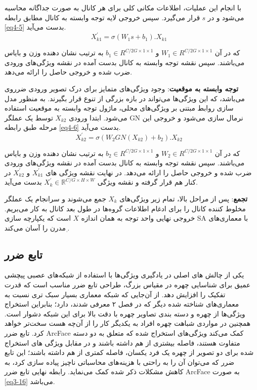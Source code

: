 \noindent
با انجام این عملیات، اطلاعات مکانی کلی برای هر کانال به صورت جداگانه محاسبه می‌شود و در $s$ قرار می‌گیرد. سپس خروجی لایه توجه وابسته به کانال مطابق رابطه \ref{eq4-5} بدست ‌می‌آید. 
\begin{equation}
X^{\prime}_{k1} = \sigma(W_1 s + b_1) . X_{k1}
\label{eq4-5}
\end{equation}

\noindent
که در آن $W_1\in R^{C/2G \times 1 \times 1} $  و  $b_1\in R^{C/2G \times 1 \times 1} $ به ترتیب نشان دهنده وزن و بایاس می‌باشند. ‌‌‌سپس نقشه توجه وابسته به کانال بدست آمده در نقشه ویژگی‌های ورودی ضرب شده و خروجی حاصل را ارائه می‌دهد.

\noindent
\textbf{توجه وابسته به موقعیت}: 
وجود ویژگی‌های متمایز برای درک تصویر ورودی ضرروی می‌باشد، که این ویژگی‌ها می‌تواند در بازه بزرگی از تنوع قرار بگیرند. به منظور مدل سازی روابط مبتنی بر ویژگی‌های محلی، ماژول توجه وابسته به موقعیت استفاده می‌شود. ابتدا ورودی $X_{k2}$ توسط یک عملگر GN  نرمال سازی می‌شود و خروجی این مرحله طبق رابطه \ref{eq4-6} بدست می‌آید.
\begin{equation}
X^{\prime}_{k2} = \sigma(W_2 GN(X_{k2}) + b_2) . X_{k2}
\label{eq4-6}
\end{equation}

\noindent
که در آن $W_2\in R^{C/2G \times 1 \times 1} $  و  $b_2\in R^{C/2G \times 1 \times 1} $ به ترتیب نشان دهنده وزن و بایاس می‌باشند. ‌‌‌سپس نقشه توجه وابسته به کانال بدست آمده در نقشه ویژگی‌های ورودی ضرب شده و خروجی حاصل را ارائه می‌دهد. در نهایت نقشه ویژگی های  $X^{\prime}_{k1}$ و $X^{\prime}_{k2}$ در کنار هم قرار گرفته و نقشه ویژگی 
$X^{\prime}_{k} \in \mathbb{R}^{C/G \times H \times W}$
بدست می‌آید. 

\noindent
\textbf{تجمع}: 
پس از مراحل بالا، تمام زیر ویژگی‌های $X_k$ جمع می‌شوند و سرانجام یک عملگر مخلوط کننده کانال  را برای ادغام اطلاعات گروه‌ها در طول بعد کانال به کار می‌بریم. خروجی نهایی واحد توجه به همان اندازه $X$ است که یکپارچه سازی SA با معماری‌های مدرن را آسان می‌‌کند ٖ\cite{yang2021sanet}.

\subsection{تابع ضرر}
یکی از چالش های اصلی در یادگیری ویژگی‌ها با استفاده از شبکه‌های عصبی پیچشی عمیق   برای شناسایی چهره در مقیاس بزرگ، طراحی تابع ضرر مناسب است که قدرت تفکیک را افزایش دهد. از آن‌جایی که ‌شبکه  معماری بسیار سبک تری نسبت به معماری‌های شناخته شده دیگر که در فصل ۲ معرفی شدند، دارد؛ بنابراین استخراج ویژگی‌ها از چهره و دسته بندی تصاویر چهره با دقت بالا برای این شبکه دشوار است. همچنین در مواردی شباهت چهره افراد به یکدیگر ‌کار را از آن‌چه هست سخت‌تر خواهد کرد. تابع ضرر ArcFace \cite{deng2019arcface} کمک می‌کند ویژگی‌های استخراج شده که متعلق به دو دسته متفاوت هستند، فاصله بیشتری از هم داشته باشند و در مقابل ویژگی های استخراج شده برای دو تصویر از چهره یک فرد یکسان، فاصله کمتری از هم داشته باشند؛ این تابع ضرر که می‌توان آن را به راحتی با هزینه‌های محاسباتی ناچیز پیاده سازی کرد، به کاهش مشکلات ذکر شده کمک می‌نماید. رابطه نهایی تابع ضرر ArcFace به صورت \ref{eq3-16} می‌باشد.

